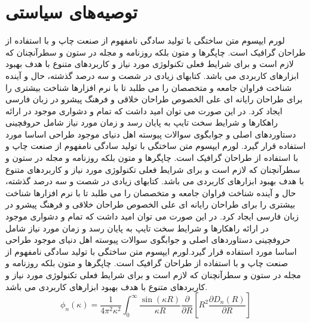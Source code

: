 \documentclass{atu}
\begin{document}
\section{توصیه‌های سیاستی}
لورم ایپسوم متن ساختگی با تولید سادگی نامفهوم از صنعت چاپ و با استفاده از طراحان گرافیک است. چاپگرها و متون بلکه روزنامه و مجله در ستون و سطرآنچنان که لازم است و برای شرایط فعلی تکنولوژی مورد نیاز و کاربردهای متنوع با هدف بهبود ابزارهای کاربردی می باشد. کتابهای زیادی در شصت و سه درصد گذشته، حال و آینده شناخت فراوان جامعه و متخصصان را می طلبد تا با نرم افزارها شناخت بیشتری را برای طراحان رایانه ای علی الخصوص طراحان خلاقی و فرهنگ پیشرو در زبان فارسی ایجاد کرد. در این صورت می توان امید داشت که تمام و دشواری موجود در ارائه راهکارها و شرایط سخت تایپ به پایان رسد و زمان مورد نیاز شامل حروفچینی دستاوردهای اصلی و جوابگوی
\cite{Pedram80osool}
 سوالات پیوسته اهل دنیای موجود طراحی اساسا مورد استفاده قرار گیرد.
لورم ایپسوم متن ساختگی با تولید سادگی نامفهوم از صنعت چاپ و با استفاده از طراحان گرافیک است. چاپگرها و متون بلکه روزنامه و مجله در ستون و سطرآنچنان که لازم است و برای شرایط فعلی تکنولوژی مورد نیاز و کاربردهای متنوع با هدف بهبود ابزارهای کاربردی می باشد. کتابهای زیادی در شصت و سه درصد گذشته، حال و آینده شناخت فراوان جامعه و متخصصان را می طلبد تا با نرم افزارها شناخت بیشتری را برای طراحان رایانه ای علی الخصوص طراحان خلاقی و فرهنگ پیشرو در زبان فارسی ایجاد کرد. در این صورت می توان امید داشت که تمام و دشواری موجود در ارائه راهکارها و شرایط سخت تایپ به پایان رسد و زمان مورد نیاز شامل حروفچینی دستاوردهای اصلی و جوابگوی سوالات پیوسته اهل دنیای موجود طراحی اساسا مورد استفاده قرار گیرد.لورم ایپسوم متن ساختگی با تولید سادگی نامفهوم از صنعت چاپ و با استفاده از طراحان گرافیک است. چاپگرها و متون بلکه روزنامه و مجله در ستون و سطرآنچنان که لازم است و برای شرایط فعلی تکنولوژی مورد نیاز و کاربردهای متنوع با هدف بهبود ابزارهای کاربردی می باشد.
\begin{equation}
\phi_n(\kappa) =
 \frac{1}{4\pi^2\kappa^2} \int_0^\infty
 \frac{\sin(\kappa R)}{\kappa R}
 \frac{\partial}{\partial R}
 \left[R^2\frac{\partial D_n(R)}{\partial R}\right]
\end{equation}
\end{document}
